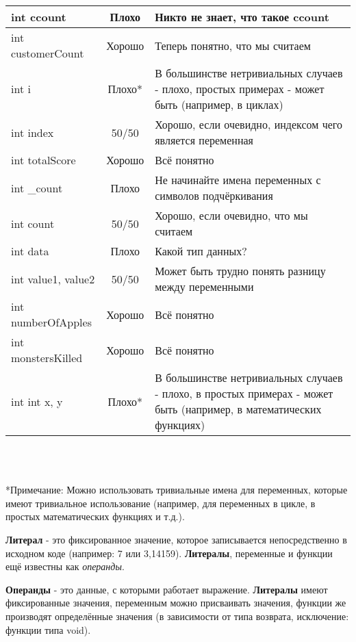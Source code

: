 \documentclass[a4paper,16pt]{report} %
\begin{document}
\begin{tabular}{ | l | c | >{\raggedright\arraybackslash}p{}| } %
	\hline
	int ccount & Плохо & Никто не знает, что такое ccount  \\ \hline %
	int customerCount & Хорошо & Теперь понятно, что мы считаем \\ \hline
	int i & Плохо* & В большинстве нетривиальных случаев - плохо, 
	простых примерах - может быть (например, в циклах) \\ \hline
	int index & 50/50 & Хорошо, если очевидно, индексом чего является переменная\\ \hline
	int totalScore & Хорошо & Всё понятно \\ \hline
	int \_count & Плохо & Не начинайте имена переменных с символов подчёркивания\\ \hline
	int count & 50/50 & Хорошо, если очевидно, что мы считаем \\ \hline
	int data & Плохо & Какой тип данных? \\ \hline
	int value1, value2 & 50/50 & Может быть трудно понять разницу между переменными \\ \hline
	int numberOfApples & Хорошо & Всё понятно \\ \hline
	int monstersKilled & Хорошо & Всё понятно \\ \hline
	int int x, y & Плохо* & В большинстве нетривиальных случаев - плохо, 
	в простых примерах - может быть (например, в математических функциях) \\ \hline
\end{tabular}
\\
\\ %
\begin{sloppypar}
*Примечание: Можно использовать тривиальные имена для переменных,
которые имеют тривиальное использование (например, для переменных в
цикле, в простых математических функциях и т.д.).
\end{sloppypar}
\begin{sloppypar}
\textbf{Литерал} - это фиксированное значение, которое записывается непосредственно в исходном коде (например: 7 или 3,14159). \textbf{Литералы}, переменные и функции ещё известны как \textit{операнды}.
\end{sloppypar}

\begin{sloppypar}
\textbf{Операнды} - это данные, с которыми работает выражение. \textbf{Литералы} имеют фиксированные значения, переменным можно присваивать значения, функции же производят определённые значения (в зависимости от типа возврата, исключение: функции типа void).
\end{sloppypar}
\end{document}
